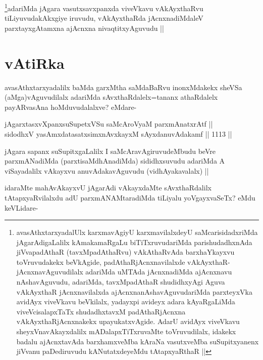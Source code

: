 \begin{artha}
\footnote{avasAthxtarxyadalUlx karxmavAgiyU karxmavilalxdeyU saMcarisidadxriMda jAgarAdigaLalilx kAmakamaRgaLu biTiTxruvudariMda parishudadhxnAda jiVvapadAthaR (tavxMpadAthaRvu) vAkAthaRvAda barxhaYkayxvu toVruvudakekx beVkAgide, padAthaRjAcnxnavilalxde vAkAyxthaR- jAcnxnavAguvudilalx adariMda uMTAda jAcnxnadiMda ajAcnxnavu nAshavAguvudu, adariMda, tavxMpadAthaR shudidhxyAgi Aguva vAkAyxthaR jAcnxnavilalxda ajAcnx\-nanAshavAguvudariMda parxteyxVka avidAyx viveVkavu beVkilalx, yadayxpi avideyx adara kAyaRgaLiMda viveVcisalapxTaTx shudadhxtavxM padAthaRjAcnxna vAkAyxthaRjAcnxnakekx upayukatxvAgide. AdarU avidAyx viveVkavu sheyxVnavAkayxdalilx mADalapxTiTxruvaMte toVruvudilalx, idakekx badalu ajAcnxtavAda barxhamxveMba kAraNa vasutxveMba suSupitxyanenx jiVvanu paDediruvudu kANutatxdeyeMdu tAtapxyaRthaR ||}adariMda jAgara vasutxsavxpanxda viveVkavu vAkAyxthaRvu tiLiyuvudakAkxgiye iruvudu, vAkAyxthaRda jAcnxnadiMdaleV parxtayxgAtamxna ajAcnxna nivaqtitxyAguvudu ||
\end{artha}

\section*{vAtiRka}

\begin{artha}
avasAthxtarxyadalilx baMda garxMtha saMdaBaRvu inonxMdakekx sheVSa (aMga)vAguvudilalx adariMda sAvxthaRdalelx=tananx athaRdalelx payARvasAna hoMduvudalalxve? eMdare-
\end{artha}

\begin{shl}
jAgarxtasxvXpanxsuSupetxVSu saMcAroV\s yaM parxmAnatxrAtf ||  \\
sidodhxV yasAmxdatasatxsimxnAvxkayxM sAyxdanuvAdakamf ||  1113 ||  
\end{shl}

\begin{artha}
jAgara sapanx suSupitxgaLalilx I saMcAravAgiruvudeMbudu beVre parxmANadiMda (parxtisaMdhAnadiMda) sididhxsuvudu adariMda A viSayadalilx vAkayxvu anuvAdakavAguvudu (vidhAyakavalalx) ||
\end{artha}

\begin{artha}
idaraMte mahAvAkayxvU jAgarAdi vAkayxdaMte sAvxthaRdalilx tAtapxyaRvilalxdu adU parxmANAMtaradiMda tiLiyalu yoVgayxvaSeTx? eMdu keVLidare-
\end{artha}


